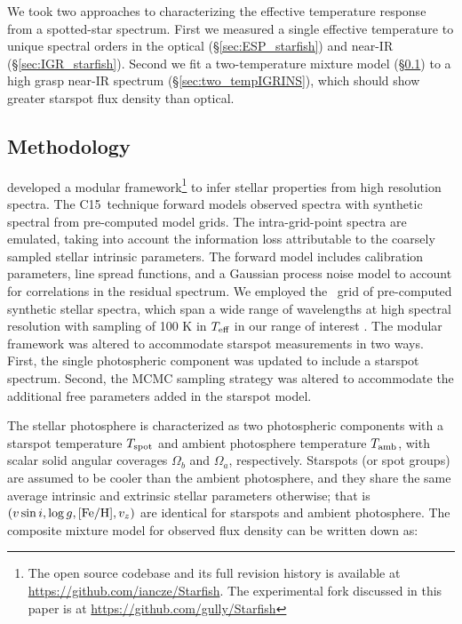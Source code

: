 \documentclass[12pt]{report}
\newcommand{\iancze}{{\sc C15}}
\begin{document}
We took two approaches to characterizing the effective temperature response from a spotted-star spectrum.  First we measured a single effective temperature to unique spectral orders in the optical (\S \ref{sec:ESP_starfish}) and near-IR (\S \ref{sec:IGR_starfish}).  Second we fit a two-temperature mixture model (\S \ref{sec:methods}) to a high grasp near-IR spectrum (\S \ref{sec:two_tempIGRINS}), which should show greater starspot flux density than optical.

\subsection{Methodology}\label{sec:methods} 

\citet[hereafter \iancze]{czekala15} developed a modular framework\footnote{The open source codebase and its full revision history is available at \url{https://github.com/iancze/Starfish}.  The experimental fork discussed in this paper is at \url{https://github.com/gully/Starfish}} to infer stellar properties from high resolution spectra.  The \iancze\ technique forward models observed spectra with synthetic spectral from pre-computed model grids.  The intra-grid-point spectra are emulated, taking into account the information loss attributable to the coarsely sampled stellar intrinsic parameters.  The forward model includes calibration parameters, line spread functions, and a Gaussian process noise model to account for correlations in the residual spectrum.  We employed the \PHOENIX\ grid of pre-computed synthetic stellar spectra, which span a wide range of wavelengths at high spectral resolution with sampling of 100 K in $T_\textrm{eff}$ in our range of interest \citep{husser13}.  The modular framework was altered to accommodate starspot measurements in two ways. First, the single photospheric component was updated to include a starspot spectrum. Second, the MCMC sampling strategy was altered to accommodate the additional free parameters added in the starspot model.

The stellar photosphere is characterized as two photospheric components with a starspot temperature $T_\textrm{spot}$ and ambient photosphere temperature $T_\textrm{amb}$, with scalar solid angular coverages $\Omega_b$ and $\Omega_a$, respectively.    Starspots (or spot groups) are assumed to be cooler than the ambient photosphere, and they share the same average intrinsic and extrinsic stellar parameters otherwise; that is $(v \sin i, \log g, [{\rm Fe}/{\rm H}], v_z)$ are identical for starspots and ambient photosphere.  The composite mixture model for observed flux density can be written down as:
\end{document}

